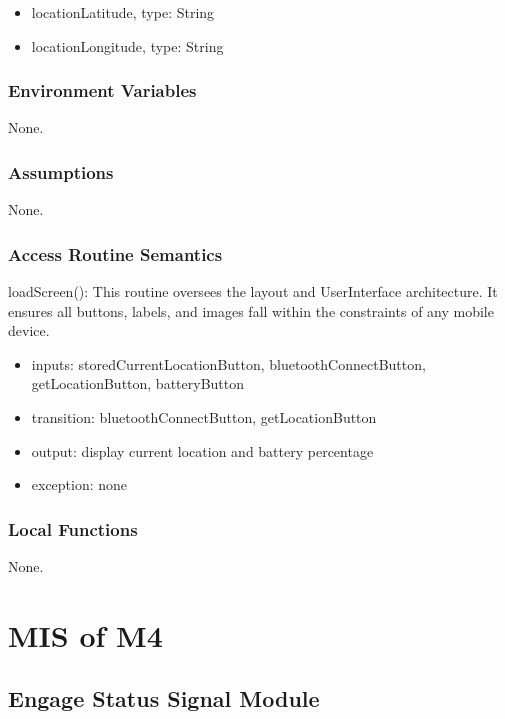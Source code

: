 \documentclass[12pt, titlepage]{article}
\begin{document}
\begin{itemize}
\item locationLatitude, type: String
\item locationLongitude, type: String
\end{itemize}


\subsubsection{Environment Variables}

None.


\subsubsection{Assumptions}

None.

\subsubsection{Access Routine Semantics}

\noindent loadScreen():
This routine oversees the layout and UserInterface architecture. It ensures all buttons, labels, and images fall within the constraints of any mobile device. 
\begin{itemize}
\item inputs: storedCurrentLocationButton, bluetoothConnectButton, getLocationButton, batteryButton
\item transition: bluetoothConnectButton, getLocationButton
\item output: display current location and battery percentage
\item exception: none
\end{itemize}

\subsubsection{Local Functions}

None.





\section{MIS of M4} \label{EngageStatus} 

\subsection{Engage Status Signal Module}
\end{document}
